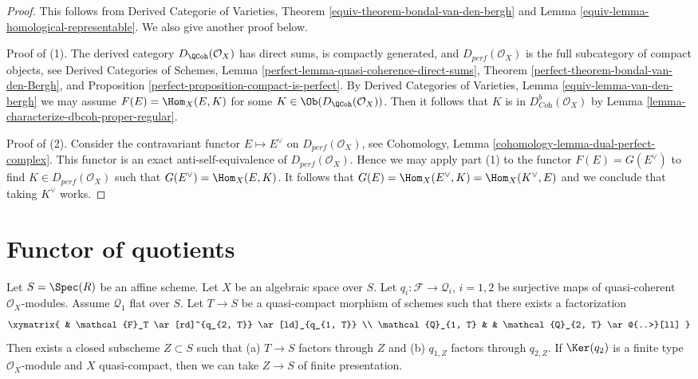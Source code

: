 \begin{proof}
This follows from Derived Categorie of Varieties, Theorem
\ref{equiv-theorem-bondal-van-den-bergh} and
Lemma \ref{equiv-lemma-homological-representable}.
We also give another proof below.

\medskip\noindent
Proof of (1). The derived category $D_\QCoh(\mathcal{O}_X)$ has direct sums,
is compactly generated, and $D_{perf}(\mathcal{O}_X)$ is the full subcategory
of compact objects, see
Derived Categories of Schemes, Lemma
\ref{perfect-lemma-quasi-coherence-direct-sums},
Theorem \ref{perfect-theorem-bondal-van-den-Bergh}, and
Proposition \ref{perfect-proposition-compact-is-perfect}.
By Derived Categories of Varieties, Lemma \ref{equiv-lemma-van-den-bergh}
we may assume
$F(E) = \Hom_X(E, K)$ for some $K \in \Ob(D_\QCoh(\mathcal{O}_X))$.
Then it follows that $K$ is in $D^b_{\textit{Coh}}(\mathcal{O}_X)$
by Lemma \ref{lemma-characterize-dbcoh-proper-regular}.

\medskip\noindent
Proof of (2). Consider the contravariant functor $E \mapsto E^\vee$
on $D_{perf}(\mathcal{O}_X)$, see
Cohomology, Lemma \ref{cohomology-lemma-dual-perfect-complex}.
This functor is an exact anti-self-equivalence of $D_{perf}(\mathcal{O}_X)$.
Hence we may apply part (1) to the functor $F(E) = G(E^\vee)$ to find
$K \in D_{perf}(\mathcal{O}_X)$ such that $G(E^\vee) = \Hom_X(E, K)$.
It follows that $G(E) = \Hom_X(E^\vee, K) = \Hom_X(K^\vee, E)$
and we conclude that taking $K^\vee$ works.
\end{proof}









\section{Functor of quotients}
\label{section-quotients}

\begin{lemma}
\label{lemma-factors-through-quotient}
Let $S = \Spec(R)$ be an affine scheme. Let $X$ be an algebraic space over
$S$. Let $q_i : \mathcal{F} \to \mathcal{Q}_i$, $i = 1, 2$
be surjective maps of quasi-coherent $\mathcal{O}_X$-modules.
Assume $\mathcal{Q}_1$ flat over $S$. Let $T \to S$ be a quasi-compact
morphism of schemes such that there exists a factorization
$$
\xymatrix{
& \mathcal{F}_T \ar[rd]^{q_{2, T}} \ar[ld]_{q_{1, T}} \\
\mathcal{Q}_{1, T} & & \mathcal{Q}_{2, T} \ar@{..>}[ll]
}
$$
Then exists a closed subscheme $Z \subset S$ such that
(a) $T \to S$ factors through $Z$ and (b)
$q_{1, Z}$ factors through $q_{2, Z}$.
If $\Ker(q_2)$ is a finite type $\mathcal{O}_X$-module and $X$
quasi-compact, then we can take $Z \to S$ of finite presentation.
\end{lemma}

